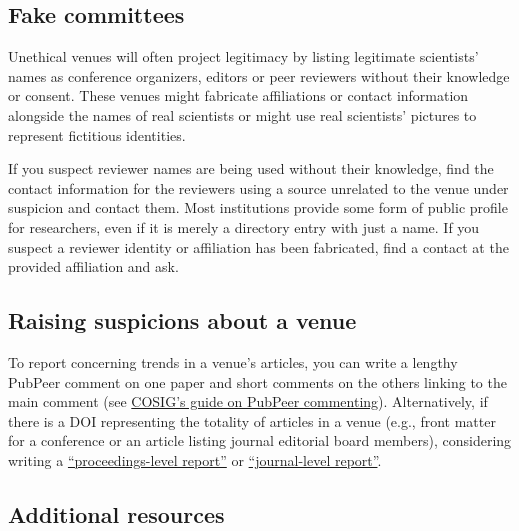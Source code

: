 \documentclass[letterpaper, 12pt]{article}
\begin{document}
\subsection*{Fake committees}

Unethical venues will often project legitimacy by listing legitimate scientists' names as conference organizers, editors or peer reviewers without their knowledge or consent. These venues might fabricate affiliations or contact information alongside the names of real scientists or might use real scientists' pictures to represent fictitious identities. 

If you suspect reviewer names are being used without their knowledge, find the contact information for the reviewers
using a source unrelated to the venue under suspicion and contact them. Most institutions provide some form of public profile for researchers,
even if it is merely a directory entry with just a name.
If you suspect a reviewer identity or affiliation has been fabricated, find a contact at the provided affiliation and ask.

\subsection*{Raising suspicions about a venue}

To report concerning trends in a venue's articles, you can write a lengthy PubPeer comment on one paper
and short comments on the others linking to the main comment (see \href{https://osf.io/sghaq}{COSIG's guide on PubPeer commenting}).
Alternatively, if there is a DOI representing the totality of articles in a venue (e.g., front matter for a conference or an article listing journal editorial board members), considering writing a \href{https://pubpeer.com/search?q=\%22proceedings-level+report\%22}{``proceedings-level report''} or \href{https://pubpeer.com/search?q=\%22journal-level+report\%22}{``journal-level report''}.

\subsection*{Additional resources}
\end{document}
